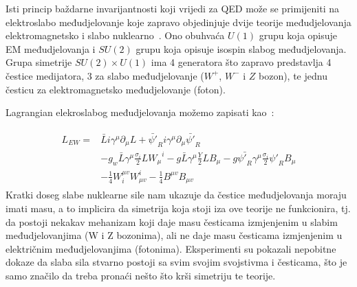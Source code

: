 \documentclass[12pt,a4paper,oneside]{article}
\begin{document}
\begin{linenumbers}
		Isti princip baždarne invarijantnosti koji vrijedi za QED može se primijeniti na elektroslabo međudjelovanje koje zapravo objedinjuje dvije teorije međudjelovanja elektromagnetsko i slabo nuklearno~\cite{doktorat}. Ono obuhvaća  \begin{math}
		U(1)
		\end{math} grupu koja opisuje EM međudjelovanja i \begin{math}
		SU(2)
		\end{math} grupu koja opisuje isospin slabog međudjelovanja. Grupa simetrije \begin{math}
		SU(2) \times U(1) 
		\end{math} ima 4 generatora što zapravo predstavlja 4 čestice medijatora, 3 za slabo međudjelovanje (\begin{math}
		W^+
		\end{math}, \begin{math}
		W^-
		\end{math} i \begin{math}
		Z
		\end{math} bozon), te jednu česticu za elektromagnetsko međudjelovanje (foton).
		
		Lagrangian elekroslabog međudjelovanja možemo zapisati kao~\cite{doktorat}:
		
		\begin{align}\label{eq:3}
		\begin{split}
		L_{EW} ={}& \bar{L}i\gamma^{\mu}\partial_\mu L + \bar{\psi '}_R i\gamma^{\mu}\partial_\mu \bar{\psi '}_R \\
		& - g_w \bar{L}\gamma^\mu \frac{\sigma_i}{2} L {W_\mu}^i - g \bar{L}\gamma^\mu \frac{Y}{2} L B_\mu - g \bar{{\psi'}_R}\gamma^\mu \frac{\sigma_i}{2} {\psi'}_R {B_\mu} \\ 
		&- \frac{1}{4}{W_{i}^{\mu v}} W_{\mu v}^{i} - \frac{1}{4}{B^{\mu v}} {B}_{\mu v}
		\end{split}
		\end{align}
		Kratki doseg slabe nuklearne sile nam ukazuje da čestice međudjelovanja moraju imati masu, a to implicira da simetrija koja stoji iza ove teorije ne funkcionira, tj. da postoji nekakav mehanizam koji daje masu česticama izmjenjenim u slabim međudjelovanjima (W i Z bozonima), ali ne daje masu česticama izmjenjenim u električnim međudjelovanjima (fotonima). Eksperimenti su pokazali nepobitne dokaze da slaba sila stvarno postoji sa svim svojim svojstivma i česticama, što je samo značilo da treba pronaći nešto što krši simetriju te teorije.
		

\end{linenumbers}
\end{document}
